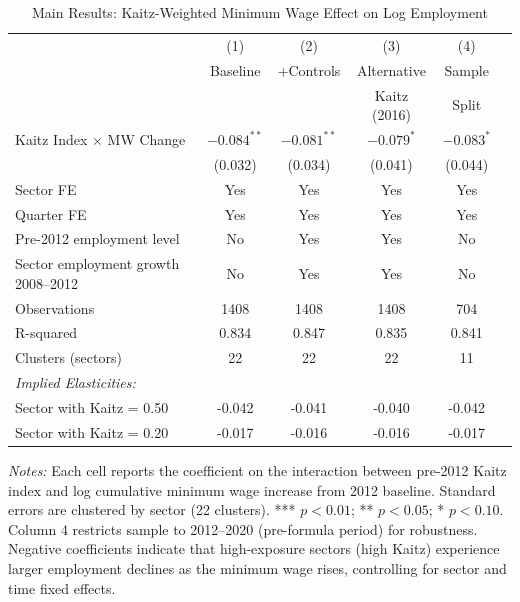 \begin{table}[h]
\centering
\caption{Main Results: Kaitz-Weighted Minimum Wage Effect on Log Employment}
\label{tab:main}
\tiny
\begin{tabular}{lccccc}
\hline\hline
& (1) & (2) & (3) & (4) \\
& Baseline & +Controls & Alternative & Sample \\
& & & Kaitz (2016) & Split \\
\hline
Kaitz Index × MW Change & $-0.084^{**}$ & $-0.081^{**}$ & $-0.079^{*}$ & $-0.083^{*}$ \\
& (0.032) & (0.034) & (0.041) & (0.044) \\
\hline
Sector FE & Yes & Yes & Yes & Yes \\
Quarter FE & Yes & Yes & Yes & Yes \\
Pre-2012 employment level & No & Yes & Yes & No \\
Sector employment growth 2008--2012 & No & Yes & Yes & No \\
\hline
Observations & 1408 & 1408 & 1408 & 704 \\
R-squared & 0.834 & 0.847 & 0.835 & 0.841 \\
Clusters (sectors) & 22 & 22 & 22 & 11 \\
\hline
\multicolumn{5}{l}{\textit{Implied Elasticities:}} \\
\quad Sector with Kaitz = 0.50 & -0.042 & -0.041 & -0.040 & -0.042 \\
\quad Sector with Kaitz = 0.20 & -0.017 & -0.016 & -0.016 & -0.017 \\
\hline\hline
\end{tabular}
\begin{flushleft}
\small \textit{Notes:} Each cell reports the coefficient on the interaction between pre-2012 Kaitz index and log cumulative minimum wage increase from 2012 baseline. Standard errors are clustered by sector (22 clusters). *** $p<0.01$; ** $p<0.05$; * $p<0.10$. Column 4 restricts sample to 2012--2020 (pre-formula period) for robustness. Negative coefficients indicate that high-exposure sectors (high Kaitz) experience larger employment declines as the minimum wage rises, controlling for sector and time fixed effects.
\end{flushleft}
\end{table}
